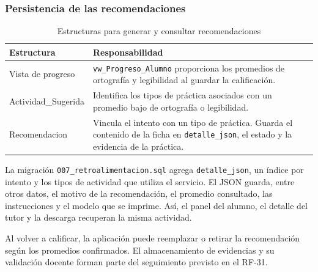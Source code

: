\subsubsection{Persistencia de las recomendaciones}
\label{sec:bd-recomendaciones}
\begin{table}[H]
\centering
\caption{Estructuras para generar y consultar recomendaciones}\label{tab:entidades_SR}
\begin{tabular}{p{3.8cm}p{10.4cm}}
\toprule Estructura & Responsabilidad \\ \midrule
Vista de progreso & \texttt{vw\_Progreso\_Alumno} proporciona los promedios de ortografía y legibilidad al guardar la calificación. \\
Actividad\_Sugerida & Identifica los tipos de práctica asociados con un promedio bajo de ortografía o legibilidad. \\
Recomendacion & Vincula el intento con un tipo de práctica. Guarda el contenido de la ficha en \texttt{detalle\_json}, el estado y la evidencia de la práctica. \\
\bottomrule
\end{tabular}
\end{table}
La migración \texttt{007\_retroalimentacion.sql} agrega \texttt{detalle\_json}, un índice por intento y los tipos de actividad que utiliza el servicio. El JSON guarda, entre otros datos, el motivo de la recomendación, el promedio consultado, las instrucciones y el modelo que se imprime. Así, el panel del alumno, el detalle del tutor y la descarga recuperan la misma actividad.

Al volver a calificar, la aplicación puede reemplazar o retirar la recomendación según los promedios confirmados. El almacenamiento de evidencias y su validación docente forman parte del seguimiento previsto en el RF-31.
